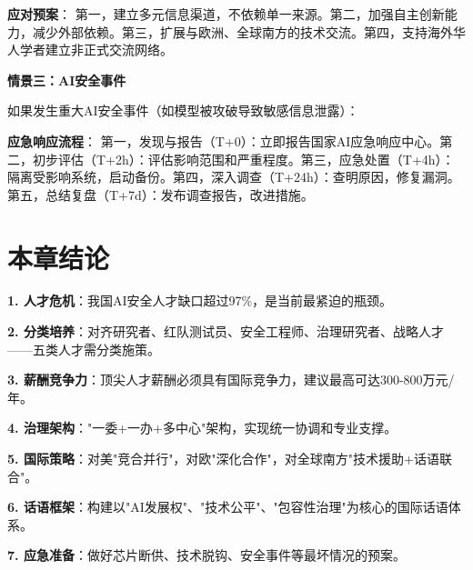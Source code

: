 \textbf{应对预案}：
第一，建立多元信息渠道，不依赖单一来源。第二，加强自主创新能力，减少外部依赖。第三，扩展与欧洲、全球南方的技术交流。第四，支持海外华人学者建立非正式交流网络。

\textbf{情景三：AI安全事件}

如果发生重大AI安全事件（如模型被攻破导致敏感信息泄露）：

\textbf{应急响应流程}：
第一，发现与报告（T+0）：立即报告国家AI应急响应中心。第二，初步评估（T+2h）：评估影响范围和严重程度。第三，应急处置（T+4h）：隔离受影响系统，启动备份。第四，深入调查（T+24h）：查明原因，修复漏洞。第五，总结复盘（T+7d）：发布调查报告，改进措施。

\section{本章结论}

\textbf{1. 人才危机}：我国AI安全人才缺口超过97\%，是当前最紧迫的瓶颈。

\textbf{2. 分类培养}：对齐研究者、红队测试员、安全工程师、治理研究者、战略人才——五类人才需分类施策。

\textbf{3. 薪酬竞争力}：顶尖人才薪酬必须具有国际竞争力，建议最高可达300-800万元/年。

\textbf{4. 治理架构}："一委+一办+多中心"架构，实现统一协调和专业支撑。

\textbf{5. 国际策略}：对美"竞合并行"，对欧"深化合作"，对全球南方"技术援助+话语联合"。

\textbf{6. 话语框架}：构建以"AI发展权"、"技术公平"、"包容性治理"为核心的国际话语体系。

\textbf{7. 应急准备}：做好芯片断供、技术脱钩、安全事件等最坏情况的预案。

